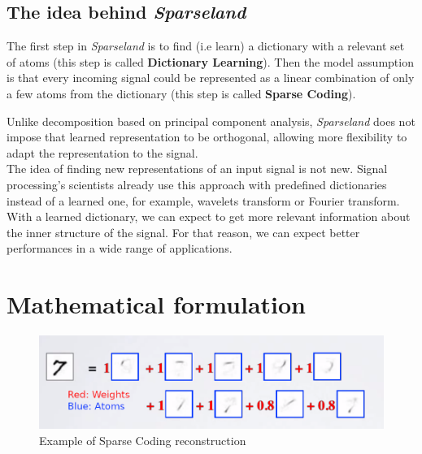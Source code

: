 \subsection{The idea behind \textit{Sparseland}}
The first step in \textit{Sparseland} is to find (i.e learn) a dictionary with a relevant set of atoms (this step is called \textbf{Dictionary Learning}). Then the model assumption is that every incoming signal could be represented as a linear combination of only a few atoms from the dictionary (this step is called \textbf{Sparse Coding}).\\ \vspace{-0.4cm}
\begin{center}
\end{center}\vspace{0.4cm}
Unlike decomposition based on principal component analysis, \textit{Sparseland} does not impose that learned representation to be orthogonal, allowing more flexibility to adapt the representation to the signal.
\\
The idea of finding new representations of an input signal is not new. Signal processing's scientists already use this approach with predefined dictionaries instead of a learned one, for example, wavelets transform or Fourier transform. With a learned dictionary, we can expect to get more relevant information about the inner structure of the signal. For that reason, we can expect better performances in a wide range of applications.

\section{Mathematical formulation}


 \begin{figure}[h]
 \centering
 \includegraphics[scale=0.5]{spacecoding_12.png}
 \caption{Example of Sparse Coding reconstruction}
 \label{fig:exemple}
\end{figure}

